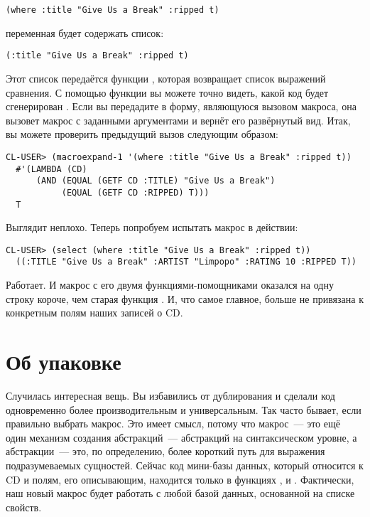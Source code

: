\begin{lstlisting}
(where :title "Give Us a Break" :ripped t)
\end{lstlisting}

переменная  будет содержать список:

\begin{lstlisting}
(:title "Give Us a Break" :ripped t)
\end{lstlisting}

Этот список передаётся функции , которая возвращает список
выражений сравнения. С помощью функции  вы можете точно видеть,
какой код будет сгенерирован . Если вы передадите в 
форму, являющуюся вызовом макроса, она вызовет макрос с заданными аргументами и вернёт его
развёрнутый вид. Итак, вы можете проверить предыдущий вызов  следующим
образом:

\begin{lstlisting}[style=lisprepl]
  CL-USER> (macroexpand-1 '(where :title "Give Us a Break" :ripped t))
  #'(LAMBDA (CD)
      (AND (EQUAL (GETF CD :TITLE) "Give Us a Break")
           (EQUAL (GETF CD :RIPPED) T)))
  T
\end{lstlisting}

Выглядит неплохо. Теперь попробуем испытать макрос в действии:

\begin{lstlisting}[style=lisprepl]
  CL-USER> (select (where :title "Give Us a Break" :ripped t))
  ((:TITLE "Give Us a Break" :ARTIST "Limpopo" :RATING 10 :RIPPED T))
\end{lstlisting}

Работает. И макрос  с его двумя функциями-помощниками оказался на одну строку
короче, чем старая функция . И, что самое главное,  больше не
привязана к конкретным полям наших записей о CD.

\section{Об упаковке}

Случилась интересная вещь. Вы избавились от дублирования и сделали код одновременно более
производительным и универсальным. Так часто бывает, если правильно выбрать макрос. Это
имеет смысл, потому что макрос~--- это ещё один механизм создания абстракций~---
абстракций на синтаксическом уровне, а абстракции~--- это, по определению, более короткий
путь для выражения подразумеваемых сущностей. Сейчас код мини-базы данных, который
относится к CD и полям, его описывающим, находится только в функциях ,
 и . Фактически, наш новый макрос будет работать с любой
базой данных, основанной на списке свойств.

